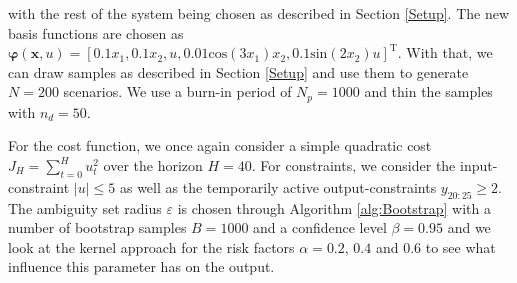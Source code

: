 with the rest of the system being chosen as described in Section \ref{Setup}. The new basis functions are chosen as $\boldsymbol{\varphi} (\boldsymbol{x}, u) = \left[0.1 x_1,  0.1 x_2,  u, 0.01 \text{cos} ( 3 x_1) x_2, 0.1 \text{sin} (2 x_2) u \right]^\text{T}$. With that, we can draw samples as described in Section \ref{Setup} and use them to generate $N = 200$ scenarios. We use a burn-in period of $N_p = 1000$ and thin the samples with $n_d = 50$.

For the cost function, we once again consider a simple quadratic cost $J_H = \sum_{t = 0}^H u_t^2$ over the horizon $H = 40$. For constraints, we consider the input-constraint $\left| u \right| \leq 5$ as well as the temporarily active output-constraints $y_{20:25} \geq 2$. The ambiguity set radius $\varepsilon$ is chosen through Algorithm \ref{alg:Bootstrap} with a number of bootstrap samples $B = 1000$ and a confidence level $\beta = 0.95$ and we look at the kernel approach for the risk factors $\alpha = 0.2$, $0.4$ and $0.6$ to see what influence this parameter has on the output.

